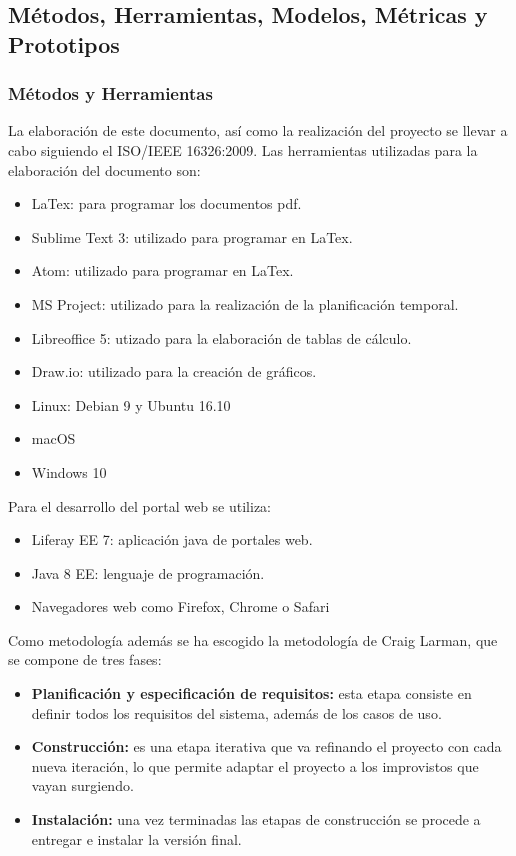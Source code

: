 \subsection{Métodos, Herramientas, Modelos, Métricas y Prototipos}
\subsubsection{Métodos y Herramientas}
\par La elaboración de este documento, así como la realización del proyecto se llevar a cabo siguiendo el ISO/IEEE 16326:2009. Las herramientas utilizadas para la elaboración del documento son:
\begin{itemize}
 	\item LaTex: para programar los documentos pdf.
 	\item Sublime Text 3: utilizado para programar en LaTex.
 	\item Atom: utilizado para programar en LaTex.
 	\item MS Project: utilizado para la realización de la planificación temporal.
 	\item Libreoffice 5: utizado para la elaboración de tablas de cálculo.
 	\item Draw.io: utilizado para la creación de gráficos.
 	\item Linux: Debian 9 y Ubuntu 16.10
 	\item macOS
 	\item Windows 10
 \end{itemize} 
 \par Para el desarrollo del portal web se utiliza:
 \begin{itemize}
 	\item Liferay EE 7: aplicación java de portales web.
 	\item Java 8 EE: lenguaje de programación.
 	\item Navegadores web como Firefox, Chrome o Safari
 \end{itemize}

 \par Como metodología además se ha escogido la metodología de Craig Larman, que se compone de tres fases:
 \begin{itemize}
 	\item \textbf{Planificación y especificación de requisitos:} esta etapa consiste en definir todos los requisitos del sistema, además de los casos de uso.
 	\item \textbf{Construcción:} es una etapa iterativa que va refinando el proyecto con cada nueva iteración, lo que permite adaptar el proyecto a los improvistos que vayan surgiendo.
 	\item \textbf{Instalación:} una vez terminadas las etapas de construcción se procede a entregar e instalar la versión final.
 \end{itemize}


